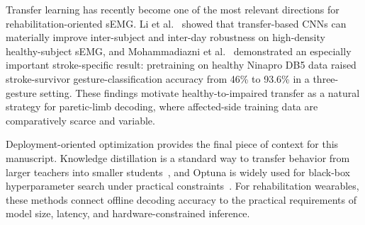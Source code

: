 Transfer learning has recently become one of the most relevant directions for rehabilitation-oriented sEMG. Li et al.~\citep{li2025transfer} showed that transfer-based CNNs can materially improve inter-subject and inter-day robustness on high-density healthy-subject sEMG, and Mohammadiazni et al.~\citep{mohammadiazni2026transfer} demonstrated an especially important stroke-specific result: pretraining on healthy Ninapro DB5 data raised stroke-survivor gesture-classification accuracy from 46\% to 93.6\% in a three-gesture setting. These findings motivate healthy-to-impaired transfer as a natural strategy for paretic-limb decoding, where affected-side training data are comparatively scarce and variable.

Deployment-oriented optimization provides the final piece of context for this manuscript. Knowledge distillation is a standard way to transfer behavior from larger teachers into smaller students~\citep{hinton2015distilling}, and Optuna is widely used for black-box hyperparameter search under practical constraints~\citep{akiba2019optuna}. For rehabilitation wearables, these methods connect offline decoding accuracy to the practical requirements of model size, latency, and hardware-constrained inference.

\begin{table}[!htbp]
  \centering
  \caption{Literature context for the current study. Reported numbers reflect different populations, sensors, gesture vocabularies, and label spaces.}
  \label{tab:literature-context}
  \begingroup
  \scriptsize
  \setlength{\tabcolsep}{3pt}
  \renewcommand{\arraystretch}{1.14}
  
  \endgroup
\end{table}
\FloatBarrier
